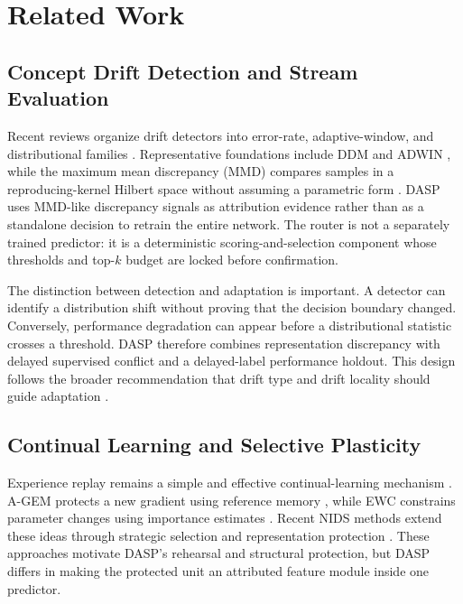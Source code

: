 \documentclass{ieeeaccess}
\begin{document}
\section{Related Work}
\label{sec:related}

\subsection{Concept Drift Detection and Stream Evaluation}
Recent reviews organize drift detectors into error-rate, adaptive-window, and distributional families \cite{Arora2024DriftReview,Lukats2025DriftBenchmark}. Representative foundations include DDM and ADWIN \cite{BaenaGarcia2006DDM,Bifet2007ADWIN}, while the maximum mean discrepancy (MMD) compares samples in a reproducing-kernel Hilbert space without assuming a parametric form \cite{Gretton2012MMD}. DASP uses MMD-like discrepancy signals as attribution evidence rather than as a standalone decision to retrain the entire network. The router is not a separately trained predictor: it is a deterministic scoring-and-selection component whose thresholds and top-$k$ budget are locked before confirmation.

The distinction between detection and adaptation is important. A detector can identify a distribution shift without proving that the decision boundary changed. Conversely, performance degradation can appear before a distributional statistic crosses a threshold. DASP therefore combines representation discrepancy with delayed supervised conflict and a delayed-label performance holdout. This design follows the broader recommendation that drift type and drift locality should guide adaptation \cite{Li2024DriftType,Aguiar2024Locality}.

\subsection{Continual Learning and Selective Plasticity}
Experience replay remains a simple and effective continual-learning mechanism \cite{Wang2024ContinualSurvey,Amalapuram2023NIDSReplay}. A-GEM protects a new gradient using reference memory \cite{Chaudhry2019AGEM}, while EWC constrains parameter changes using importance estimates \cite{Kirkpatrick2017EWC}. Recent NIDS methods extend these ideas through strategic selection and representation protection \cite{Zhang2025SSF,Liu2026RepShield}. These approaches motivate DASP's rehearsal and structural protection, but DASP differs in making the protected unit an attributed feature module inside one predictor.
\end{document}
